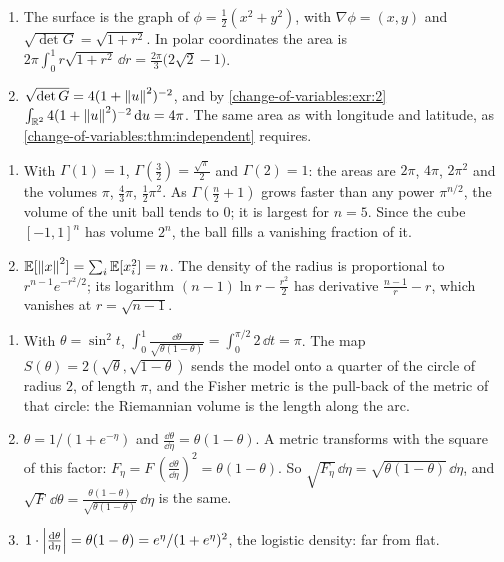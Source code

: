 \begin{enumerate}[nosep]
  \item The surface is the graph of $\phi = \frac12(x^2 + y^2)$, with
        $\nabla\phi = (x, y)$ and $\sqrt{\det G} = \sqrt{1 + r^2}$. In
        polar coordinates the area is
        $2\pi\int_0^1r\sqrt{1 + r^2}\,\dd r
        = \frac{2\pi}3\bigl(2\sqrt2 - 1\bigr)$.
  \item $\sqrt{\det G} = 4(1 + \left\|u\right\|^2)^{-2}$, and by
        \cref{change-of-variables:exr:2}
        $\int_{\mathbb{R}^2}4(1 + \left\|u\right\|^2)^{-2}\,\mathrm{d} u = 4\pi$. The same area
        as with longitude and latitude, as
        \cref{change-of-variables:thm:independent} requires.
\end{enumerate}

\begin{enumerate}[nosep]
  \item With $\Gamma(1) = 1$, $\Gamma(\frac32) = \frac{\sqrt\pi}2$ and
        $\Gamma(2) = 1$: the areas are $2\pi$, $4\pi$, $2\pi^2$ and the
        volumes $\pi$, $\frac43\pi$, $\frac12\pi^2$. As
        $\Gamma(\frac n2 + 1)$ grows faster than any power
        $\pi^{n/2}$, the volume of the unit ball tends to $0$; it is
        largest for $n = 5$. Since the cube $[-1, 1]^n$ has volume
        $2^n$, the ball fills a vanishing fraction of it.
  \item $\mathbb{E}[\left\|x\right\|^2] = \sum_i\mathbb{E}[x_i^2] = n$. The density of the
        radius is proportional to $r^{n-1}e^{-r^2/2}$; its logarithm
        $(n - 1)\ln r - \frac{r^2}2$ has derivative
        $\frac{n - 1}r - r$, which vanishes at $r = \sqrt{n - 1}$.
\end{enumerate}

\begin{enumerate}[nosep]
  \item With $\theta = \sin^2t$,
        $\int_0^1\frac{\dd\theta}{\sqrt{\theta(1 - \theta)}}
        = \int_0^{\pi/2}2\,\dd t = \pi$. The map
        $S(\theta) = 2(\sqrt\theta, \sqrt{1 - \theta})$ sends the model
        onto a quarter of the circle of radius $2$, of length $\pi$,
        and the Fisher metric is the pull-back of the metric of that
        circle: the Riemannian volume is the length along the arc.
  \item $\theta = 1/(1 + e^{-\eta})$ and
        $\frac{\dd\theta}{\dd\eta} = \theta(1 - \theta)$. A metric
        transforms with the square of this factor:
        $F_\eta = F\,(\frac{\dd\theta}{\dd\eta})^2 = \theta(1 - \theta)$.
        So $\sqrt{F_\eta}\,\dd\eta = \sqrt{\theta(1 - \theta)}\,\dd\eta$,
        and
        $\sqrt F\,\dd\theta
        = \frac{\theta(1 - \theta)}{\sqrt{\theta(1 - \theta)}}\,\dd\eta$
        is the same.
  \item $1\cdot\left|\frac{\mathrm{d}\theta}{\mathrm{d}\eta}\right| = \theta(1 - \theta)
        = e^\eta/(1 + e^\eta)^2$, the logistic density: far from flat.
\end{enumerate}

